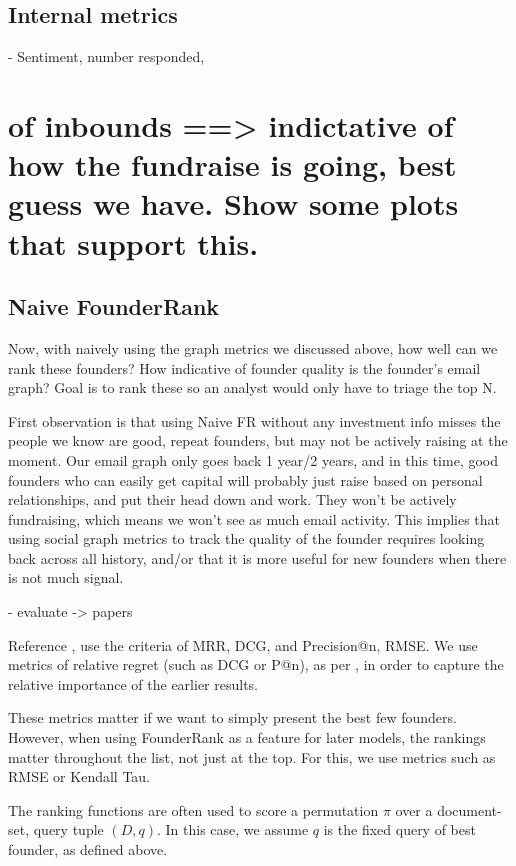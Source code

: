\subsection{Internal metrics}

- Sentiment, number responded, \section{of inbounds ==> indictative of how the fundraise is going, best guess we have. Show some plots that support this.}

\subsection{Naive FounderRank}

Now, with naively using the graph metrics we discussed above, how well can we rank these founders? How indicative of founder quality is the founder's email graph? Goal is to rank these so an analyst would only have to triage the top N.

First observation is that using Naive FR without any investment info misses the people we know are good, repeat founders, but may not be actively raising at the moment. Our email graph only goes back 1 year/2 years, and in this time, good founders who can easily get capital will probably just raise based on personal relationships, and put their head down and work. They won't be actively fundraising, which means we won't see as much email activity. This implies that using social graph metrics to track the quality of the founder requires looking back across all history, and/or that it is more useful for new founders when there is not much signal.

- evaluate -> papers

Reference \cite{DBLP:journals/corr/abs-0704-3359}, use the criteria of MRR, DCG, and Precision@n, RMSE. We use metrics of relative regret (such as DCG or P@n), as per \cite{DBLP:journals/corr/abs-0704-3359}, in order to capture the relative importance of the earlier results.

These metrics matter if we want to simply present the best few founders. However, when using FounderRank as a feature for later models, the rankings matter throughout the list, not just at the top. For this, we use metrics such as RMSE or Kendall Tau.

The ranking functions are often used to score a permutation $\pi$ over a document-set, query tuple $(D, q)$. In this case, we assume $q$ is the fixed query of best founder, as defined above.

